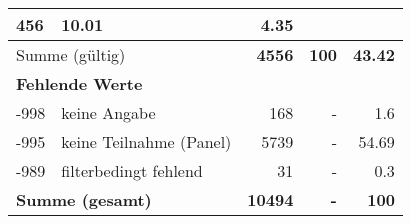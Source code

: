 \begin{longtable}{lXrrr}
       \num{456} &
       \num[round-mode=places,round-precision=2]{10,01} &
         \num[round-mode=places,round-precision=2]{4,35} \\
     \midrule
     \multicolumn{2}{l}{Summe (gültig)} &
       \textbf{\num{4556}} &
     \textbf{100} &
       \textbf{\num[round-mode=places,round-precision=2]{43,42}} \\
     \multicolumn{5}{l}{\textbf{Fehlende Werte}}\\
       -998 &
       keine Angabe &
         \num{168} &
        - &
         \num[round-mode=places,round-precision=2]{1,6} \\
       -995 &
       keine Teilnahme (Panel) &
         \num{5739} &
        - &
         \num[round-mode=places,round-precision=2]{54,69} \\
       -989 &
       filterbedingt fehlend &
         \num{31} &
        - &
         \num[round-mode=places,round-precision=2]{0,3} \\
     \midrule
     \multicolumn{2}{l}{\textbf{Summe (gesamt)}} &
          \textbf{\num{10494}} &
        \textbf{-} &
        \textbf{100} \\
     \bottomrule
     \end{longtable}
     
